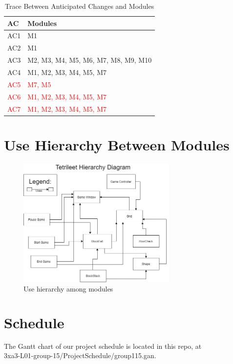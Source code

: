 \documentclass[12pt, titlepage]{article}
\begin{document}
\begin{table}[H]
\centering
\begin{tabular}{p{} p{}}
\toprule
\textbf{AC} & \textbf{Modules}\\
\midrule
AC1 & M1\\
AC2 & M1\\
AC3 & M2, M3, M4, M5, M6, M7, M8, M9, M10\\
AC4 & M1, M2, M3, M4, M5, M7\\
\textcolor{red}{AC5} & \textcolor{red}{M7, M5}\\
\textcolor{red}{AC6} & \textcolor{red}{M1, M2, M3, M4, M5, M7}\\
\textcolor{red}{AC7} & \textcolor{red}{M1, M2, M3, M4, M5, M7}\\

\bottomrule
\end{tabular}
\caption{Trace Between Anticipated Changes and Modules}
\label{TblACT}
\end{table}
\section{Use Hierarchy Between Modules} \label{SecUse}
\begin{figure}[H]
\centering
\includegraphics[width=0.7\textwidth]{Heirarchy.png}
\caption{Use hierarchy among modules}
\label{FigUH}
\end{figure}


\section{Schedule} \label{SecUse}

The Gantt chart of our project schedule is located in this repo, at\\ 3xa3-L01-group-15/ProjectSchedule/group115.gan.
\end{document}
